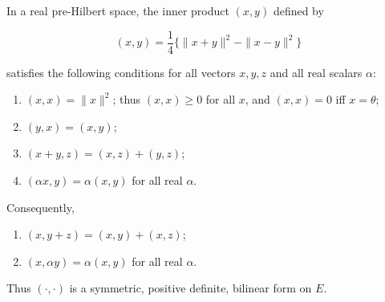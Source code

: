In a real pre-Hilbert space, the inner product $(x, y)$ defined by

$$(x, y) = \frac{1}{4}\bigl\{\|x + y\|^2 - \|x - y\|^2\bigr\}$$

satisfies the following conditions for all vectors $x, y, z$ and all real scalars $\alpha$:

\begin{enumerate}
\item[(i)] $(x, x) = \|x\|^2$; thus $(x, x) \geq 0$ for all $x$, and $(x, x) = 0$ iff $x = \theta$;
\item[(ii)] $(y, x) = (x, y)$;
\item[(iii)] $(x + y, z) = (x, z) + (y, z)$;
\item[(iv)] $(\alpha x, y) = \alpha(x, y)$ for all real $\alpha$.
\end{enumerate}

Consequently,

\begin{enumerate}
\item[(v)] $(x, y + z) = (x, y) + (x, z)$;
\item[(vi)] $(x, \alpha y) = \alpha(x, y)$ for all real $\alpha$.
\end{enumerate}

Thus $(\cdot, \cdot)$ is a symmetric, positive definite, bilinear form on $E$.
